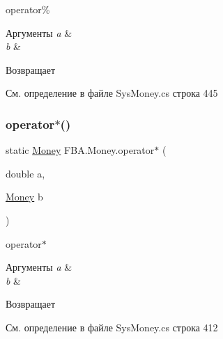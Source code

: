 operator\% 


\begin{DoxyParams}{Аргументы}
{\em a} & \\
\hline
{\em b} & \\
\hline
\end{DoxyParams}
\begin{DoxyReturn}{Возвращает}

\end{DoxyReturn}


См. определение в файле Sys\+Money.\+cs строка 445

\mbox{\label{struct_f_b_a_1_1_money_a1c5231c36006792a35bad7e4dbfe6d45}} 
\subsubsection{\texorpdfstring{operator$\ast$()}{operator*()}\hspace{0.1cm}{\footnotesize\ttfamily [1/2]}}
{\footnotesize\ttfamily static \mbox{\hyperlink{struct_f_b_a_1_1_money}{Money}} F\+B\+A.\+Money.\+operator$\ast$ (\begin{DoxyParamCaption}\item[{double}]{a,  }\item[{\mbox{\hyperlink{struct_f_b_a_1_1_money}{Money}}}]{b }\end{DoxyParamCaption})\hspace{0.3cm}{\ttfamily [static]}}



operator$\ast$ 


\begin{DoxyParams}{Аргументы}
{\em a} & \\
\hline
{\em b} & \\
\hline
\end{DoxyParams}
\begin{DoxyReturn}{Возвращает}

\end{DoxyReturn}


См. определение в файле Sys\+Money.\+cs строка 412

\mbox{\label{struct_f_b_a_1_1_money_acf6a7e573a83201a4af2d3d8314aea94}} 
